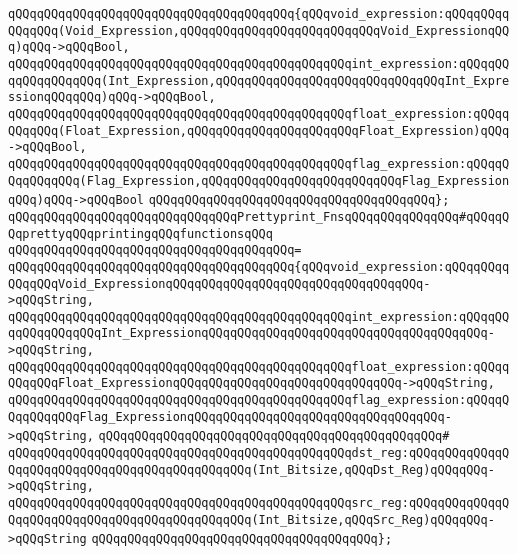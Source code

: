 \verb|qQQqqQQqqQQqqQQqqQQqqQQqqQQqqQQqqQQqqQQq{qQQqvoid_expression:qQQqqQQqqQQqqQQq(Void_Expression,qQQqqQQqqQQqqQQqqQQqqQQqqQQqVoid_ExpressionqQQq)qQQq->qQQqBool,|\newline
\verb|qQQqqQQqqQQqqQQqqQQqqQQqqQQqqQQqqQQqqQQqqQQqqQQqint_expression:qQQqqQQqqQQqqQQqqQQq(Int_Expression,qQQqqQQqqQQqqQQqqQQqqQQqqQQqqQQqInt_ExpressionqQQqqQQq)qQQq->qQQqBool,|\newline
\verb|qQQqqQQqqQQqqQQqqQQqqQQqqQQqqQQqqQQqqQQqqQQqqQQqfloat_expression:qQQqqQQqqQQq(Float_Expression,qQQqqQQqqQQqqQQqqQQqqQQqFloat_Expression)qQQq->qQQqBool,|\newline
\verb|qQQqqQQqqQQqqQQqqQQqqQQqqQQqqQQqqQQqqQQqqQQqqQQqflag_expression:qQQqqQQqqQQqqQQq(Flag_Expression,qQQqqQQqqQQqqQQqqQQqqQQqqQQqFlag_ExpressionqQQq)qQQq->qQQqBool|\newline
\verb|qQQqqQQqqQQqqQQqqQQqqQQqqQQqqQQqqQQqqQQq};|\newline
\newline
\verb|qQQqqQQqqQQqqQQqqQQqqQQqqQQqqQQqPrettyprint_FnsqQQqqQQqqQQqqQQq#qQQqqQQqprettyqQQqprintingqQQqfunctionsqQQq|\newline
\verb|qQQqqQQqqQQqqQQqqQQqqQQqqQQqqQQqqQQqqQQq=|\newline
\verb|qQQqqQQqqQQqqQQqqQQqqQQqqQQqqQQqqQQqqQQq{qQQqvoid_expression:qQQqqQQqqQQqqQQqVoid_ExpressionqQQqqQQqqQQqqQQqqQQqqQQqqQQqqQQqqQQq->qQQqString,|\newline
\verb|qQQqqQQqqQQqqQQqqQQqqQQqqQQqqQQqqQQqqQQqqQQqqQQqint_expression:qQQqqQQqqQQqqQQqqQQqInt_ExpressionqQQqqQQqqQQqqQQqqQQqqQQqqQQqqQQqqQQqqQQq->qQQqString,|\newline
\verb|qQQqqQQqqQQqqQQqqQQqqQQqqQQqqQQqqQQqqQQqqQQqqQQqfloat_expression:qQQqqQQqqQQqFloat_ExpressionqQQqqQQqqQQqqQQqqQQqqQQqqQQqqQQq->qQQqString,|\newline
\verb|qQQqqQQqqQQqqQQqqQQqqQQqqQQqqQQqqQQqqQQqqQQqqQQqflag_expression:qQQqqQQqqQQqqQQqFlag_ExpressionqQQqqQQqqQQqqQQqqQQqqQQqqQQqqQQqqQQq->qQQqString,|\newline
\verb|qQQqqQQqqQQqqQQqqQQqqQQqqQQqqQQqqQQqqQQqqQQqqQQq#|\newline
\verb|qQQqqQQqqQQqqQQqqQQqqQQqqQQqqQQqqQQqqQQqqQQqqQQqdst_reg:qQQqqQQqqQQqqQQqqQQqqQQqqQQqqQQqqQQqqQQqqQQqqQQq(Int_Bitsize,qQQqDst_Reg)qQQqqQQq->qQQqString,|\newline
\verb|qQQqqQQqqQQqqQQqqQQqqQQqqQQqqQQqqQQqqQQqqQQqqQQqsrc_reg:qQQqqQQqqQQqqQQqqQQqqQQqqQQqqQQqqQQqqQQqqQQqqQQq(Int_Bitsize,qQQqSrc_Reg)qQQqqQQq->qQQqString|\newline
\verb|qQQqqQQqqQQqqQQqqQQqqQQqqQQqqQQqqQQqqQQq};|\newline
